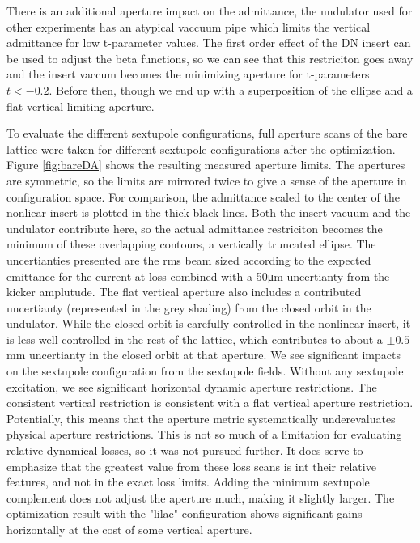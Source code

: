 There is an additional aperture impact on the admittance, the undulator used for other experiments has an atypical vaccuum pipe which limits the vertical admittance for low t-parameter values. The first order effect of the DN insert can be used to adjust the beta functions, so we can see that this restriciton goes away and the insert vaccum becomes the minimizing aperture for t-parameters $t<-0.2$. Before then, though we end up with a superposition of the ellipse and a flat vertical limiting aperture.


To evaluate the different sextupole configurations, full aperture scans of the bare lattice were taken for different sextupole configurations after the optimization. Figure \ref{fig:bareDA} shows the resulting measured aperture limits. The apertures are symmetric, so the limits are mirrored twice to give a sense of the aperture in configuration space. For comparison, the admittance scaled to the center of the nonliear insert is plotted in the thick black lines. Both the insert vacuum and the undulator contribute here, so the actual admittance restriciton becomes the minimum of these overlapping contours, a vertically truncated ellipse. The uncertianties presented are the rms beam sized according to the expected emittance for the current at loss combined with a 50\unit{\micro m} uncertianty from the kicker amplutude. The flat vertical aperture also includes a contributed uncertianty (represented in the grey shading) from the closed orbit in the undulator. While the closed orbit is carefully controlled in the nonlinear insert, it is less well controlled in the rest of the lattice, which contributes to about a $\pm 0.5$mm uncertianty in the closed orbit at that aperture. We see significant impacts on the sextupole configuration from the sextupole fields. Without any sextupole excitation, we see significant horizontal dynamic aperture restrictions. The consistent vertical restriction is consistent with a flat vertical aperture restriction. Potentially, this means that the aperture metric systematically underevaluates physical aperture restrictions. This is not so much of a limitation for evaluating relative dynamical losses, so it was not pursued further. It does serve to emphasize that the greatest value from these loss scans is int their relative features, and not in the exact loss limits. Adding the minimum sextupole complement does not adjust the aperture much, making it slightly larger. The optimization result with the "lilac" configuration shows significant gains horizontally at the cost of some vertical aperture.

